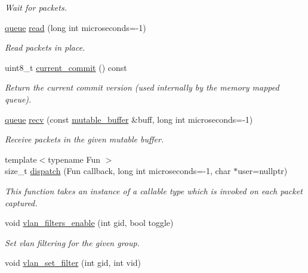 \begin{DoxyCompactItemize}
\begin{DoxyCompactList}\small\item\em Wait for packets. \end{DoxyCompactList}\item 
\hyperlink{classpfq_1_1queue}{queue} \hyperlink{classpfq_1_1socket_a6a79c81d3c366e49b8d64eb828ae5540}{read} (long int microseconds=-\/1)
\begin{DoxyCompactList}\small\item\em Read packets in place. \end{DoxyCompactList}\item 
uint8\+\_\+t \hyperlink{classpfq_1_1socket_aba44de6422e3e10b65474e7f3999ebd0}{current\+\_\+commit} () const 
\begin{DoxyCompactList}\small\item\em Return the current commit version (used internally by the memory mapped queue). \end{DoxyCompactList}\item 
\hyperlink{classpfq_1_1queue}{queue} \hyperlink{classpfq_1_1socket_ace69fbf64216b7b30a8a305a9d25229b}{recv} (const \hyperlink{namespacepfq_ad7b88920eaf729154354741132483ea8}{mutable\+\_\+buffer} \&buff, long int microseconds=-\/1)
\begin{DoxyCompactList}\small\item\em Receive packets in the given mutable buffer. \end{DoxyCompactList}\item 
{\footnotesize template$<$typename Fun $>$ }\\size\+\_\+t \hyperlink{classpfq_1_1socket_ae6cd08be2e7c35a548a64fded4359612}{dispatch} (Fun callback, long int microseconds=-\/1, char $\ast$user=nullptr)
\begin{DoxyCompactList}\small\item\em This function takes an instance of a callable type which is invoked on each packet captured. \end{DoxyCompactList}\item 
void \hyperlink{classpfq_1_1socket_aaf91b2e089edb2c4695584b01774326e}{vlan\+\_\+filters\+\_\+enable} (int gid, bool toggle)
\begin{DoxyCompactList}\small\item\em Set vlan filtering for the given group. \end{DoxyCompactList}\item 
void \hyperlink{classpfq_1_1socket_a92eeaf78ff595546c517b5699c9a5b1e}{vlan\+\_\+set\+\_\+filter} (int gid, int vid)

\end{DoxyCompactItemize}

